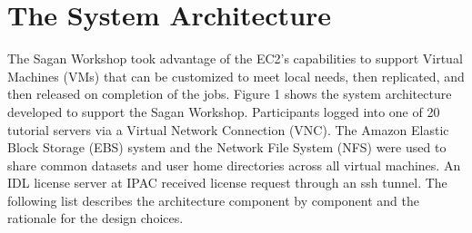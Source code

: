 \section{The System Architecture}

The Sagan Workshop took advantage of the EC2's capabilities to support Virtual Machines (VMs) that can be customized to meet local needs, then replicated, and then released on completion of the jobs. Figure 1 shows the system architecture developed to support the Sagan Workshop. Participants logged into one of 20 tutorial servers via a Virtual Network Connection (VNC). The Amazon Elastic Block Storage (EBS) system and the Network File System (NFS) were used to share common datasets and user home directories across all virtual machines. An IDL license server at IPAC received license request through an ssh tunnel. The following list describes the architecture component by component and the rationale for the design choices.



